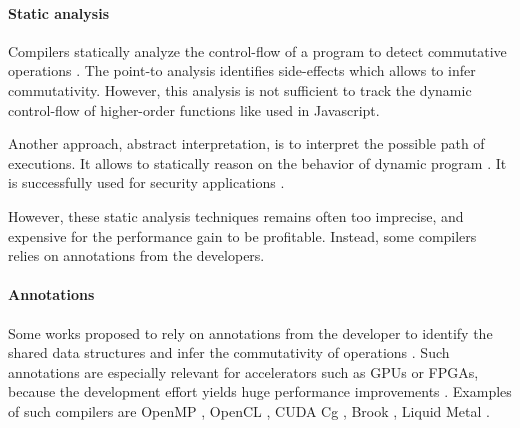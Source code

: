 


\paragraph{Static analysis}

Compilers statically analyze the control-flow of a program to detect commutative operations \cite{Allen1970}.
The point-to analysis identifies side-effects \cite{Andersen1994,Jang2009,Sridharan2012,Wei2014} which allows to infer commutativity.
However, this analysis is not sufficient to track the dynamic control-flow of higher-order functions \cite{Shivers1991} like used in Javascript.

Another approach, abstract interpretation, is to interpret the possible path of executions.
It allows to statically reason on the behavior of dynamic program \cite{Maffeis2008,Smith2011,Gardner2012,Hackett2012,Raychev2013,Gardner2013,Bodin2014}.
It is successfully used for security applications \cite{Huang2004,Jovanovic2006,Yu2007,Maffeis2009a,Chudnov2015,Dolby2015}.

However, these static analysis techniques remains often too imprecise, and expensive for the performance gain to be profitable.
Instead, some compilers relies on annotations from the developers.

\paragraph{Annotations}

Some works proposed to rely on annotations from the developer to identify the shared data structures and infer the commutativity of operations \cite{Vandierendonck2010a,Fernandez2014a}.
Such annotations are especially relevant for accelerators such as GPUs or FPGAs, because the development effort yields huge performance improvements \cite{Tarditi2006}.
Examples of such compilers are OpenMP \cite{Dagum1998}, OpenCL \cite{Stone2010}, CUDA \cite{Nvidia2007} Cg \cite{Mark2003}, Brook \cite{Buck2004}, Liquid Metal \cite{Huang2008}.

